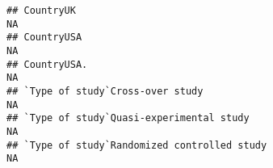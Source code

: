 \documentclass[]{article}
\begin{document}
\begin{verbatim}
## CountryUK                                                                                                                                                                                                                                                                                                                                                                                                                                                                               NA
## CountryUSA                                                                                                                                                                                                                                                                                                                                                                                                                                                                              NA
## CountryUSA.                                                                                                                                                                                                                                                                                                                                                                                                                                                                             NA
## `Type of study`Cross-over study                                                                                                                                                                                                                                                                                                                                                                                                                                                         NA
## `Type of study`Quasi-experimental study                                                                                                                                                                                                                                                                                                                                                                                                                                                 NA
## `Type of study`Randomized controlled study                                                                                                                                                                                                                                                                                                                                                                                                                                              NA

\end{verbatim}
\end{document}
